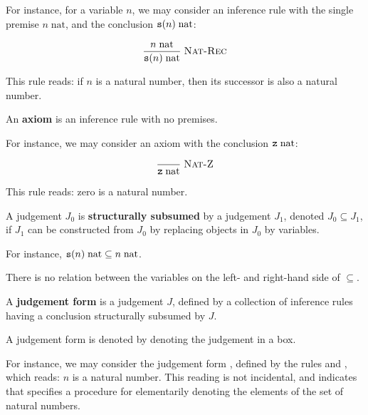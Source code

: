 For instance, for a variable $n$, we may consider an inference rule with the
single premise $n\;\text{nat}$, and the conclusion $\mathtt{s}(n)\;\text{nat}$:

$$
\judgement[Nat-Rec]{
  n\;\text{nat}
}{
  \symb{s}(n)\;\text{nat}
}
$$

This rule reads: if $n$ is a natural number, then its successor is also a
natural number.

\begin{definition}

An \textbf{axiom} is an inference rule with no premises.

\end{definition}

For instance, we may consider an axiom with the conclusion
$\mathtt{z}\;\text{nat}$:

$$
\judgement[Nat-Z]{
}{
  \symb{z}\;\text{nat}
}
$$

This rule reads: zero is a natural number.

\begin{definition}

A judgement $J_0$ is \textbf{structurally subsumed} by a judgement $J_1$,
denoted $J_0\subseteq J_1$, if $J_1$ can be constructed from $J_0$ by replacing
objects in $J_0$ by variables.

\end{definition}

For instance, $\mathtt{s}(n)\;\text{nat}\subseteq n\;\text{nat}$.

\begin{remark}

There is no relation between the variables on the left- and right-hand side of
$\subseteq$.

\end{remark}

\begin{definition}

A \textbf{judgement form} is a judgement $J$, defined by a collection of
inference rules having a conclusion structurally subsumed by $J$.

\end{definition}

\begin{notation}

A judgement form is denoted by denoting the judgement in a box.

\end{notation}

For instance, we may consider the judgement form ,
defined by the rules  and , which reads: $n$ is
a natural number. This reading is not incidental, and indicates that
 specifies a procedure for elementarily denoting the
elements of the set of natural numbers.

